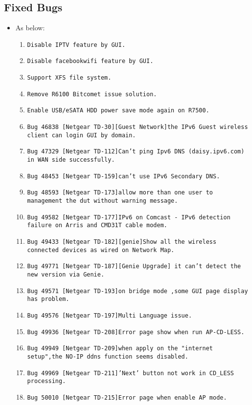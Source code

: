 \documentclass[12pt]{report}
\begin{document}
    \subsection{Fixed Bugs}
    \begin{itemize}
    \item As below:
    	\begin{enumerate}
		\item \texttt{Disable IPTV feature by GUI.}
		\item \texttt{Disable facebookwifi feature by GUI.}
		\item \texttt{Support XFS file system.}
		\item \texttt{Remove R6100 Bitcomet issue solution.}
		\item \texttt{Enable USB/eSATA HDD power save mode again on R7500.}
		\item \texttt{Bug 46838 [Netgear TD-30][Guest Network]the IPv6 Guest wireless client can login GUI by domain.}
		\item \texttt{Bug 47329 [Netgear TD-112]Can't ping Ipv6 DNS (daisy.ipv6.com) in WAN side successfully.}
		\item \texttt{Bug 48453 [Netgear TD-159]can't use IPv6 Secondary DNS.}
		\item \texttt{Bug 48593 [Netgear TD-173]allow more than one user to management the dut without warning message.}
		\item \texttt{Bug 49582 [Netgear TD-177]IPv6 on Comcast - IPv6 detection failure on Arris and CMD31T cable modem.}
		\item \texttt{Bug 49433 [Netgear TD-182][genie]Show all the wireless connected devices as wired on Network Map.}
		\item \texttt{Bug 49771 [Netgear TD-187][Genie Upgrade] it can't detect the new version via Genie.}
		\item \texttt{Bug 49571 [Netgear TD-193]on bridge mode ,some GUI page display has problem.}
		\item \texttt{Bug 49576 [Netgear TD-197]Multi Language issue.}
		\item \texttt{Bug 49936 [Netgear TD-208]Error page show when run AP-CD-LESS.}
		\item \texttt{Bug 49949 [Netgear TD-209]when apply on the "internet setup",the NO-IP ddns function seems disabled.}
		\item \texttt{Bug 49969 [Netgear TD-211]'Next' button not work in CD\_LESS processing.}
		\item \texttt{Bug 50010 [Netgear TD-215]Error page when enable AP mode.}

\end{enumerate}
\end{itemize}
\end{document}
